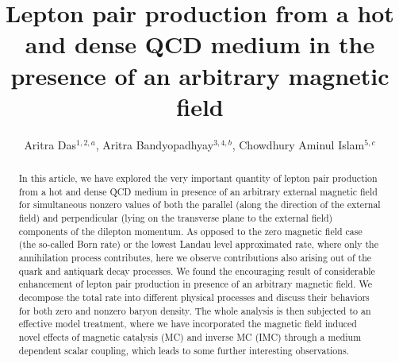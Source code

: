 \documentclass[aps,prd,floatfix,showpacs,showkeys,superscriptadress,unsortedaddress,nofootinbib,onecolumn]{revtex4-1}
\begin{document}
\title{Lepton pair production from a hot and dense QCD medium in the presence of an arbitrary magnetic field}
\author{Aritra Das$^{1,2,a}$, Aritra Bandyopadhyay$^{3,4,b}$, Chowdhury Aminul Islam$^{5,c}$}

\begin{abstract}
{In this article, we have explored the very important quantity of lepton pair production from a hot and dense QCD medium in presence of an arbitrary external magnetic field for simultaneous nonzero values of both the parallel (along the direction of the external field) and perpendicular (lying on the transverse plane to the external field) components of the dilepton momentum. As opposed to the zero magnetic field case (the so-called Born rate) or the lowest Landau level approximated rate, where only the annihilation process contributes, here we observe contributions also arising out of the quark and antiquark decay processes. We found the encouraging result of considerable enhancement of lepton pair production in presence of an arbitrary magnetic field. We decompose the total rate into different physical processes and discuss their behaviors for both zero and nonzero baryon density. The whole analysis is then subjected to an effective model treatment, where we have incorporated the magnetic field induced novel effects of magnetic catalysis (MC) and inverse MC (IMC) through a medium dependent scalar coupling, which leads to some further interesting observations.}
\end{abstract}

\maketitle
\end{document}
